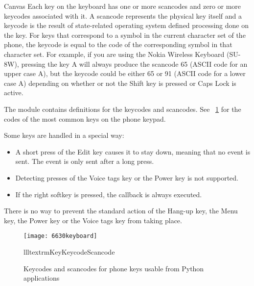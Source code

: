 \begin{classdesc}{Canvas}{}
Each key on the keyboard has one or more scancodes and zero or more keycodes 
associated with it. A scancode represents the physical key itself and a 
keycode is the result of state-related operating system defined processing 
done on the key. For keys that correspond to a symbol in the current 
character set of the phone, the keycode is equal to the code of the 
corresponding symbol in that character set. For example, if you are using 
the Nokia Wireless Keyboard (SU-8W), pressing the key A will always produce 
the scancode 65 (ASCII code for an upper case A), but the keycode 
could be either 65 or 91 (ASCII code for a lower case A) depending on 
whether or not the Shift key is pressed or Caps Lock is active. 

The  module contains definitions for the keycodes and 
scancodes. See \figurename~\ref{fig:keyboard} for the codes of the most 
common keys on the phone keypad. 

Some keys are handled in a special way:

\begin{itemize}
\item A short press of the Edit key causes it to stay down, meaning that no  event is sent. The event is only sent after a long press.
\item Detecting presses of the Voice tags key or the Power key is not supported.
\item If the right softkey is pressed, the  callback is always executed.
\end{itemize}

There is no way to prevent the standard action of the Hang-up key, the Menu 
key, the Power key or the Voice tags key from taking place.

\begin{figure}
\centering
\texttt{[image: 6630keyboard]}
\begin{tableiii}{lll}{textrm}{Key}{Keycode}{Scancode}
\end{tableiii}
\caption{Keycodes and scancodes for phone keys usable from Python applications}
\label{fig:keyboard}
\end{figure}


\end{classdesc}
